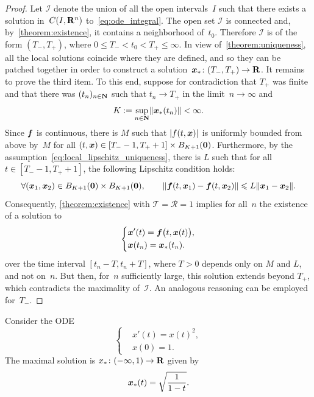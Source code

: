 \begin{proof}
    Let $\mathcal I$ denote the union of all the open intervals~$I$ such that there exists a solution in~$C(I, \mathbf R^n)$ to~\eqref{eq:ode_integral}.
    The open set $\mathcal I$ is connected and, by~\cref{theorem:existence},
    it contains a neighborhood of~$t_0$.
    Therefore $\mathcal I$ is of the form $(T_-, T_+)$,
    where $0 \leq T_- <  t_0 < T_+ \leq \infty$.
    In view of~\cref{theorem:uniqueness},
    all the local solutions coincide where they are defined,
    and so they can be patched together in order to construct a solution~$\mathbf{\boldsymbol{x}}_*\colon (T_-, T_+) \to \mathbf R$.
    It remains to prove the third item.
    To this end, suppose for contradiction that $T_+$ was finite and that
    there was $(t_n)_{n \in \mathbf N}$ such that $t_n \to T_+$ in the limit~$n \to \infty$ and~
    \[
        K := \sup_{n \in \mathbf N} \lVert\mathbf{\boldsymbol{x}}_*(t_n)\rVert < \infty.
    \]
    Since $\mathbf{\boldsymbol{f}}$ is continuous,
    there is $M$ such that $\lvert f(t, \mathbf{\boldsymbol{x}}) \rvert$ is uniformly bounded from above by~$M$ for all $(t, \mathbf{\boldsymbol{x}}) \in [T_- - 1, T_+ + 1] \times B_{K+1}(\mathbf{\boldsymbol{0}})$.
    Furthermore, by the assumption~\eqref{eq:local_lipschitz_uniqueness},
    there is $L$ such that for all $t \in [T_- - 1, T_+ + 1]$,
    the following Lipschitz condition holds:
    \[
        \forall (\mathbf{\boldsymbol{x}}_1, \mathbf{\boldsymbol{x}}_2) \in  B_{K+1}(\mathbf{\boldsymbol{0}}) \times B_{K+1}(\mathbf{\boldsymbol{0}}), \qquad
        \lVert \mathbf{\boldsymbol{f}}(t, \mathbf{\boldsymbol{x}}_1) - \mathbf{\boldsymbol{f}}(t, \mathbf{\boldsymbol{x}}_2) \rVert \leqslant L \lVert\mathbf{\boldsymbol{x}}_1 - \mathbf{\boldsymbol{x}}_2\rVert.
    \]
    Consequently, \cref{theorem:existence} with $\mathcal T = \mathcal R = 1$ implies for all~$n$ the existence of a solution to
    \[
        \left \{
        \begin{aligned}
            & \mathbf{\boldsymbol{x}}'(t) = \mathbf{\boldsymbol{f}}\bigl(t, \mathbf{\boldsymbol{x}}(t)\bigr), \\
            & \mathbf{\boldsymbol{x}}(t_n) = \mathbf{\boldsymbol{x}}_*(t_n).
        \end{aligned}
        \right.
    \]
    over the time interval $[t_n - T, t_n + T]$, where $T > 0$ depends only on $M$ and $L$, and not on~$n$.
    But then, for~$n$ sufficiently large,
    this solution extends beyond $T_+$,
    which contradicts the maximality of~$\mathcal I$.
    An analogous reasoning can be employed for~$T_-$.
\end{proof}
\begin{example}
    Consider the ODE
    \[
        \left \{
        \begin{aligned}
            & x'(t) = x(t)^2, \\
            & x(0) = 1.
        \end{aligned}
        \right.
    \]
    The maximal solution is $x_* \colon (-\infty, 1) \to \mathbf R$ given by
    \[
        \mathbf{\boldsymbol{x}}_*(t) = \sqrt{\frac{1}{1-t}}.
    \]
\end{example}

